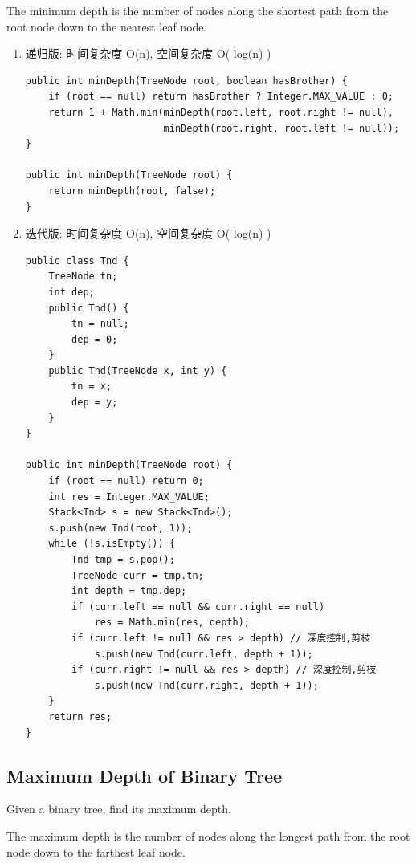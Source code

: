 \documentclass[12pt]{book}
\begin{document}
The minimum depth is the number of nodes along the shortest path from the root node down to the nearest leaf node.
\begin{enumerate}
\item 递归版: 时间复杂度 O(n), 空间复杂度 O( log(n) )
\label{sec-4-5-1-1}

\lstset{language=java,label= ,caption= ,numbers=none}
\begin{lstlisting}
public int minDepth(TreeNode root, boolean hasBrother) {
    if (root == null) return hasBrother ? Integer.MAX_VALUE : 0;
    return 1 + Math.min(minDepth(root.left, root.right != null),
                        minDepth(root.right, root.left != null));
}

public int minDepth(TreeNode root) {
    return minDepth(root, false);
}
\end{lstlisting}

\item 迭代版: 时间复杂度 O(n), 空间复杂度 O( log(n) )
\label{sec-4-5-1-2}

\lstset{language=java,label= ,caption= ,numbers=none}
\begin{lstlisting}
public class Tnd {
    TreeNode tn;
    int dep;
    public Tnd() {
        tn = null;
        dep = 0;
    }
    public Tnd(TreeNode x, int y) {
        tn = x;
        dep = y;
    }
}

public int minDepth(TreeNode root) {
    if (root == null) return 0;
    int res = Integer.MAX_VALUE;
    Stack<Tnd> s = new Stack<Tnd>();
    s.push(new Tnd(root, 1));
    while (!s.isEmpty()) {
        Tnd tmp = s.pop();
        TreeNode curr = tmp.tn;
        int depth = tmp.dep;
        if (curr.left == null && curr.right == null)
            res = Math.min(res, depth);
        if (curr.left != null && res > depth) // 深度控制,剪枝
            s.push(new Tnd(curr.left, depth + 1));
        if (curr.right != null && res > depth) // 深度控制,剪枝
            s.push(new Tnd(curr.right, depth + 1));
    }
    return res;
}
\end{lstlisting}
\end{enumerate}

\subsection{Maximum Depth of Binary Tree}
\label{sec-4-5-2}
Given a binary tree, find its maximum depth.

The maximum depth is the number of nodes along the longest path from the root node down to the farthest leaf node.
\end{document}
